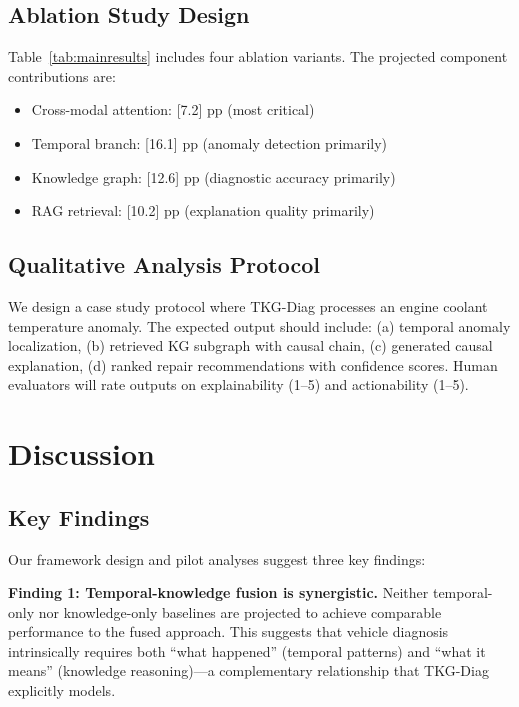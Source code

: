 \documentclass[11pt,a4paper]{article}
\begin{document}
\subsection{Ablation Study Design}\label{sec:exp:ablation}

Table~\ref{tab:mainresults} includes four ablation variants. The projected component contributions are:
\begin{itemize}[leftmargin=1.5em]
    \item Cross-modal attention: [7.2] pp (most critical)
    \item Temporal branch: [16.1] pp (anomaly detection primarily)
    \item Knowledge graph: [12.6] pp (diagnostic accuracy primarily)
    \item RAG retrieval: [10.2] pp (explanation quality primarily)
\end{itemize}

\subsection{Qualitative Analysis Protocol}\label{sec:exp:qualitative}

We design a case study protocol where TKG-Diag processes an engine coolant temperature anomaly. The expected output should include: (a) temporal anomaly localization, (b) retrieved KG subgraph with causal chain, (c) generated causal explanation, (d) ranked repair recommendations with confidence scores. Human evaluators will rate outputs on explainability (1--5) and actionability (1--5).

\section{Discussion}\label{sec:discussion}

\subsection{Key Findings}\label{sec:disc:findings}

Our framework design and pilot analyses suggest three key findings:

\textbf{Finding 1: Temporal-knowledge fusion is synergistic.} Neither temporal-only nor knowledge-only baselines are projected to achieve comparable performance to the fused approach. This suggests that vehicle diagnosis intrinsically requires both ``what happened'' (temporal patterns) and ``what it means'' (knowledge reasoning)---a complementary relationship that TKG-Diag explicitly models.
\end{document}
